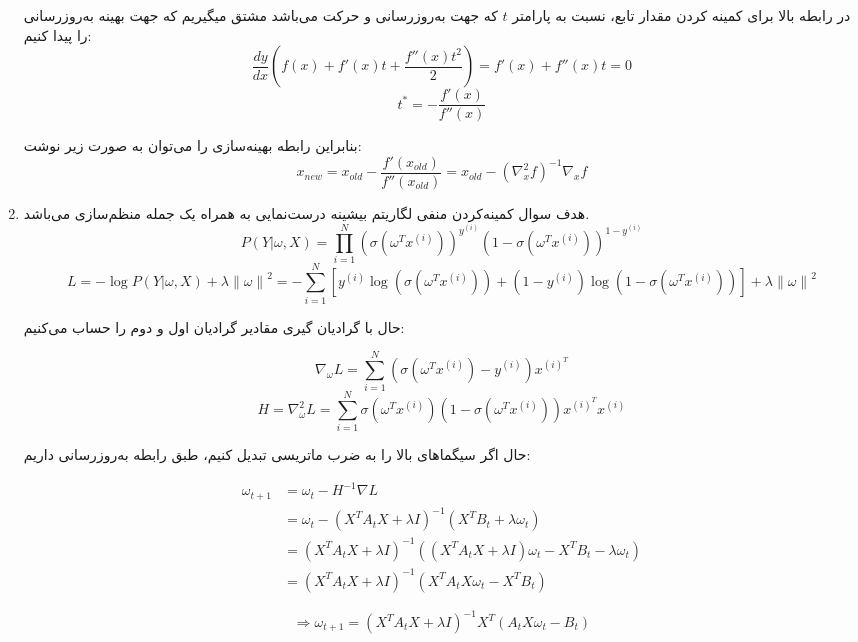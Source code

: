 \documentclass{article}
\begin{document}
\begin{enumerate}
	در رابطه بالا برای کمینه کردن مقدار تابع، نسبت به پارامتر $t$ که جهت به‌روزرسانی و حرکت می‌باشد مشتق میگیریم که جهت بهینه به‌روزرسانی را پیدا کنیم:
	$$
	\frac{{dy}}{{dx}}\left( {f\left( x \right) + f'\left( x \right)t + \frac{{f''\left( x \right){t^2}}}{2}} \right) = f'\left( x \right) + f''\left( x \right)t = 0
	$$
	$$
	{t^*} =  - \frac{{f'\left( x \right)}}{{f''\left( x \right)}}
	$$

	بنابراین رابطه بهینه‌سازی را می‌توان به صورت زیر نوشت:
	$$ x_{new} = x_{old} - \frac{f'(x_{old})}{f''(x_{old})} = x_{old} - (\nabla^2_x f)^{-1} \nabla_x f$$
	 
		\item
	
	هدف سوال کمینه‌کردن منفی لگاریتم بیشینه درست‌نمایی به همراه یک جمله منظم‌سازی می‌باشد.
	$$
	P\left( {Y|\omega ,X} \right) = \prod\limits_{i = 1}^N {{{\left( {\sigma \left( {{\omega ^T}{x^{\left( i \right)}}} \right)} \right)}^{{y^{\left( i \right)}}}}{{\left( {1 - \sigma \left( {{\omega ^T}{x^{\left( i \right)}}} \right)} \right)}^{1 - {y^{\left( i \right)}}}}}
	$$
	$$
	L =  - \log P\left( {Y|\omega ,X} \right) + \lambda {\left\| \omega  \right\|^2} =  - \sum\limits_{i = 1}^N {\left[ {{y^{\left( i \right)}}\log \left( {\sigma \left( {{\omega ^T}{x^{\left( i \right)}}} \right)} \right) + \left( {1 - {y^{\left( i \right)}}} \right)\log \left( {1 - \sigma \left( {{\omega ^T}{x^{\left( i \right)}}} \right)} \right)} \right]}  + \lambda {\left\| \omega  \right\|^2}
	$$
	
	حال با گرادیان گیری مقادیر گرادیان اول و دوم را حساب می‌کنیم:
	
	$$
	{\nabla _\omega }L = \sum\limits_{i = 1}^N {\left( {\sigma \left( {{\omega ^T}{x^{\left( i \right)}}} \right) - {y^{\left( i \right)}}} \right){x^{{{\left( i \right)}^T}}}}
	$$
	$$
	H = \nabla _\omega ^2L = \sum\limits_{i = 1}^N {\sigma \left( {{\omega ^T}{x^{\left( i \right)}}} \right)\left( {1 - \sigma \left( {{\omega ^T}{x^{\left( i \right)}}} \right)} \right){x^{{{\left( i \right)}^T}}}{x^{\left( i \right)}}}
	$$
	
	
	حال اگر سیگماهای بالا را به ضرب ماتریسی تبدیل کنیم،‌ طبق رابطه به‌روزرسانی داریم:
	
	$$
	\begin{aligned}
		{\omega _{t + 1}} & = {\omega _t} - {H^{ - 1}}\nabla L\\
		& = {\omega _t} - {\left( {{X^T}{A_t}X + \lambda I} \right)^{ - 1}}\left( {{X^T}{B_t} + \lambda {\omega _t}} \right)\\
		&‌= {\left( {{X^T}{A_t}X + \lambda I} \right)^{ - 1}}\left( {\left( {{X^T}{A_t}X + \lambda I} \right){\omega _t} - {X^T}{B_t} - \lambda {\omega _t}} \right)\\
		&‌= {\left( {{X^T}{A_t}X + \lambda I} \right)^{ - 1}}\left( {{X^T}{A_t}X{\omega _t} - {X^T}{B_t}} \right)
	\end{aligned}
	$$
	
	$$
	\Rightarrow
	{\omega _{t + 1}} = {\left( {{X^T}{A_t}X + \lambda I} \right)^{ - 1}}{X^T}\left( {{A_t}X{\omega _t} - {B_t}} \right)
	$$
	
\end{enumerate}
\end{document}
